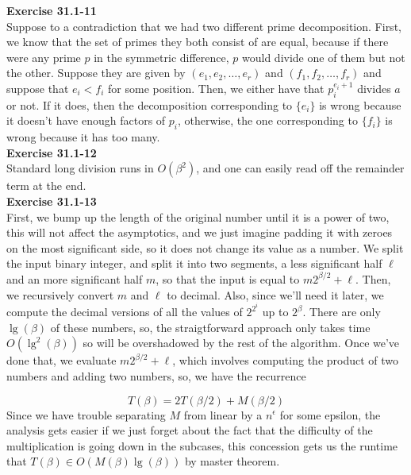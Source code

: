 \documentclass{article}
\begin{document}
\noindent\textbf{Exercise 31.1-11}\\

Suppose to a contradiction that we had two different prime decomposition. First, we know that the set of primes they both consist of are equal, because if there were any prime $p$ in the symmetric difference, $p$ would divide one of them but not the other. Suppose they are given by $(e_1,e_2, \ldots,e_r)$ and $(f_1,f_2,\ldots,f_r)$ and suppose that $e_i < f_i$ for some position. Then, we either have that $p_i^{e_i+1}$ divides $a$ or not. If it does, then the decomposition corresponding to $\{e_i\}$ is wrong because it doesn't have enough factors of $p_i$, otherwise, the one corresponding to $\{f_i\}$ is wrong because it has too many.\\

\noindent\textbf{Exercise 31.1-12}\\

Standard long division runs in $O(\beta^2)$, and one can easily read off the remainder term at the end. \\

\noindent\textbf{Exercise 31.1-13}\\

First, we bump up the length of the original number until it is a power of two, this will not affect the asymptotics, and we just imagine padding it with zeroes on the most significant side, so it does not change its value as a number. We split the input binary integer, and split it into two segments, a less significant half $\ell$ and an more significant half $m$, so that the input is equal to $m2^{\beta/2} + \ell$. Then, we recursively convert $m$ and $\ell$ to decimal. Also, since we'll need it later, we compute the decimal versions of all the values of $2^{2^i}$ up to $2^{\beta}$. There are only $\lg(\beta)$ of these numbers, so, the straigtforward approach only takes time $O(\lg^2(\beta))$ so will be overshadowed by the rest of the algorithm. Once we've done that, we evaluate $m2^{\beta/2} + \ell$, which involves computing the product of two numbers and adding two numbers, so, we have the recurrence

\[
T( \beta) = 2T(\beta/2) + M(\beta/2)
\]
Since we have trouble separating $M$ from linear by a $n^{\epsilon}$ for some epsilon, the analysis gets easier if we just forget about the fact that the difficulty of the multiplication is going down in the subcases, this concession gets us the runtime that $T(\beta) \in O(M(\beta) \lg(\beta))$ by master theorem.
\end{document}
